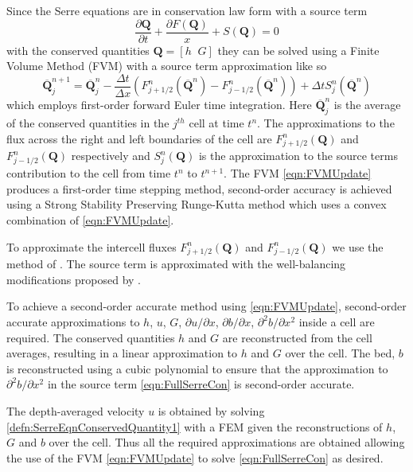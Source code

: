 \documentclass[AMA,STIX1COL]{WileyNJD-v2}
\newcommand{\vecn}[1]{\boldsymbol{#1}}
\begin{document}
Since the Serre equations are in conservation law form with a source term
\begin{equation*}
\frac{\partial \vecn{Q} }{\partial t} + \frac{\partial F(\vecn{Q} )}{x} + S(\vecn{Q} ) = 0
\end{equation*}
with the conserved quantities $\vecn{Q}  = \left[h \; \; G\right]$ they can be solved using a Finite Volume Method (FVM) with a source term approximation like so
\begin{equation}
\label{eqn:FVMUpdate}
\overline{\vecn{Q} }^{n+1}_j = \overline{\vecn{Q} }^{n}_j - \frac{\Delta t}{\Delta x} \left(F^n_{j+1/2}\left(\overline{\vecn{Q} }^{n} \right) - F^n_{j-1/2}\left(\overline{\vecn{Q} }^{n} \right) \right) + \Delta t S^n_j\left(\overline{\vecn{Q} }^{n} \right)
\end{equation}
which employs first-order forward Euler time integration. Here $\overline{\vecn{Q} }^{n}_j $ is the average of the conserved quantities in the $j^{th}$ cell at time $t^n$. The approximations to the flux across the right and left boundaries of the cell are $F^n_{j+1/2}\left(\vecn{Q} \right)$ and $ F^n_{j-1/2}\left(\vecn{Q} \right)$ respectively and $S^n_j\left(\vecn{Q} \right)$ is the approximation to the source terms contribution to the cell from time $t^n$ to $t^{n+1}$. The FVM \eqref{eqn:FVMUpdate} produces a first-order time stepping method, second-order accuracy is achieved using a Strong Stability Preserving Runge-Kutta method \cite{Gottlieb-etal-2003-89} which uses a convex combination of \eqref{eqn:FVMUpdate}.

To approximate the intercell fluxes $F^n_{j+1/2}\left(\vecn{Q} \right)$ and $F^n_{j-1/2}\left(\vecn{Q} \right)$ we use the method of \citet{Kurganov-etal-2001-707}. The source term is approximated with the well-balancing modifications proposed by \citet{Klein-etal-2004-2050}.

To achieve a second-order accurate method using \eqref{eqn:FVMUpdate}, second-order accurate approximations to $h$, $u$, $G$, $\partial u / \partial x$, $\partial b / \partial x$, $\partial^2 b / \partial x^2$ inside a cell are required. The conserved quantities $h$ and $G$ are reconstructed from the cell averages, resulting in a linear approximation to $h$ and $G$ over the cell. The bed, $b$ is reconstructed using a cubic polynomial to ensure that the approximation to $\partial^2 b / \partial x^2$ in the source term \eqref{eqn:FullSerreCon} is second-order accurate. 

The depth-averaged velocity $u$ is obtained by solving \eqref{defn:SerreEqnConservedQuantity1} with a FEM given the reconstructions of $h$, $G$ and $b$ over the cell. Thus all the required approximations are obtained allowing the use of the FVM \eqref{eqn:FVMUpdate} to solve \eqref{eqn:FullSerreCon} as desired.
\end{document}
